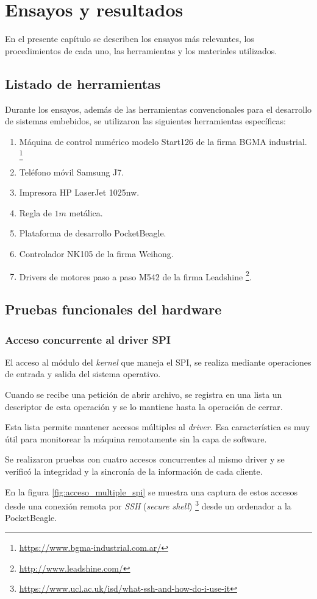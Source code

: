 \chapter{Ensayos y resultados} %
\label{Chapter4}

En el presente capítulo se describen los ensayos más relevantes, los procedimientos de cada uno, las herramientas y los materiales utilizados.

\section{Listado de herramientas}

Durante los ensayos, además de las herramientas convencionales para el desarrollo de sistemas embebidos, se utilizaron las siguientes herramientas específicas:
\begin{enumerate}
   \item{Máquina de control numérico modelo Start126 de la firma BGMA industrial. \footnote{\url{https://www.bgma-industrial.com.ar/}}}
   \item{Teléfono móvil Samsung J7.}
   \item{Impresora HP LaserJet 1025nw.}
   \item{Regla de $1m$ metálica.}
   \item{Plataforma de desarrollo PocketBeagle.}
   \item{Controlador NK105 de la firma Weihong.}
   \item{Drivers de motores paso a paso M542 de la firma Leadshine \footnote{\url{http://www.leadshine.com/}}.}
\end{enumerate}

\section{Pruebas funcionales del hardware}
\label{sec:pruebasHW}

\subsection{Acceso concurrente al driver SPI}
El acceso al módulo del \textit{kernel} que maneja el SPI, se realiza mediante operaciones de entrada y salida del sistema operativo.\par
Cuando se recibe una petición de abrir archivo, se registra en una lista un descriptor de esta operación y se lo mantiene hasta la operación de cerrar. \par
Esta lista permite mantener accesos múltiples al \textit{driver}. Esa característica es muy útil para monitorear la máquina remotamente sin la capa de software.\par
Se realizaron pruebas con cuatro accesos concurrentes al mismo driver y se verificó la integridad y la sincronía de la información de cada cliente.\par
En la figura \ref{fig:acceso_multiple_spi} se muestra una captura de estos accesos desde una conexión remota por \textit{SSH} (\textit{secure shell}) \footnote{\url{https://www.ucl.ac.uk/isd/what-ssh-and-how-do-i-use-it}} desde un ordenador a la PocketBeagle.

